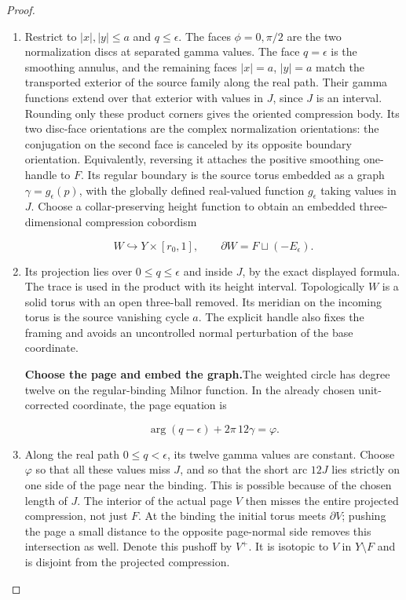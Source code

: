 \begin{proof}
\begin{enumerate}[label=\arabic*.]
\[
 q=xy=|z|^2\cos\phi\sin\phi\geq0.
\]

\item Restrict to \(|x|,|y|\leq a\) and \(q\leq\epsilon\).
The faces \(\phi=0,\pi/2\) are the two normalization discs at
separated gamma values.  The face \(q=\epsilon\) is the smoothing
annulus, and the remaining faces \(|x|=a\), \(|y|=a\) match the
transported exterior of the source family along the real path.
Their gamma functions extend over that exterior with values in
\(J\), since \(J\) is an interval.  Rounding only these product
corners gives the oriented compression body.  Its two disc-face
orientations are the complex normalization orientations: the
conjugation on the second face is canceled by its opposite boundary
orientation.  Equivalently, reversing it attaches the positive
smoothing one-handle to \(F\).  Its regular boundary is the source
torus embedded as a graph \(\gamma=g_\epsilon(p)\), with the
globally defined real-valued function \(g_\epsilon\) taking values
in \(J\).  Choose a collar-preserving height function to obtain
an embedded three-dimensional compression cobordism

\[
 W\hookrightarrow Y\times[r_0,1],\qquad
 \partial W=F\sqcup(-E_\epsilon).
\]

\item Its projection lies over \(0\leq q\leq\epsilon\) and inside \(J\),
by the exact displayed formula.  The trace is used in the product
with its height interval.  Topologically \(W\) is a solid torus
with an open three-ball removed.  Its meridian on the incoming
torus is the source vanishing cycle \(a\).  The explicit handle
also fixes the framing and avoids an uncontrolled normal
perturbation of the base coordinate.

\par\medskip\noindent\textbf{Choose the page and embed the graph.}\enspace The weighted circle
has degree twelve on the regular-binding Milnor function.  In the
already chosen unit-corrected coordinate, the page equation is

\[
 \arg(q-\epsilon)+2\pi\,12\gamma=\varphi.
\]

\item Along the real path \(0\leq q<\epsilon\), its twelve gamma values
are constant.  Choose \(\varphi\) so that all these values miss
\(J\), and so that the short arc \(12J\) lies strictly on one side
of the page near the binding.  This is possible because of the
chosen length of \(J\).  The interior of the actual page \(V\)
then misses the entire projected compression, not just \(F\).
At the binding the initial torus meets \(\partial V\); pushing the
page a small distance to the opposite page-normal side removes this
intersection as well.  Denote this pushoff by \(V^+\).  It is
isotopic to \(V\) in \(Y\setminus F\) and is disjoint from the
projected compression.


\end{enumerate}
\end{proof}

